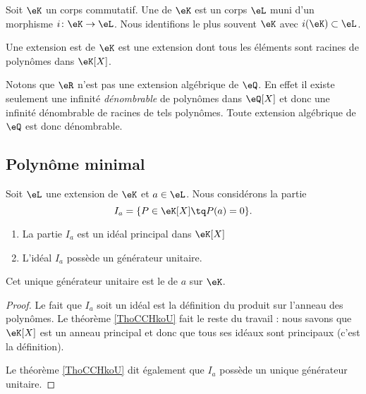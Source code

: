 \begin{definition}      \label{DEFooFLJJooGJYDOe}
    Soit \( \eK\) un corps commutatif. Une  de \( \eK\) est un corps \( \eL\) muni d'un morphisme \( i\colon \eK\to \eL\). Nous identifions le plus souvent \( \eK\) avec \( i(\eK)\subset \eL\).

    Une extension est  de \( \eK\) est une extension dont tous les éléments sont racines de polynômes dans \( \eK[X]\).
\end{definition}
Notons que \( \eR\) n'est pas une extension algébrique de \( \eQ\). En effet il existe seulement une infinité \emph{dénombrable} de polynômes dans \( \eQ[X]\) et donc une infinité dénombrable de racines de tels polynômes. Toute extension algébrique de \( \eQ\) est donc dénombrable.

\subsection{Polynôme minimal}

\begin{lemmaDef}    \label{DefCVMooFGSAgL}
    Soit \( \eL\) une extension de \( \eK\) et \( a\in \eL\). Nous considérons la partie
    \begin{equation}
        I_a=\{ P\in \eK[X]\tq P(a)=0 \}.
    \end{equation}

    \begin{enumerate}
        \item
            La partie \( I_a\) est un idéal principal dans \( \eK[X]\)
        \item
            L'idéal \( I_a\) possède un générateur unitaire.
    \end{enumerate}

    Cet unique générateur unitaire est le  de \( a\) sur \( \eK\).
\end{lemmaDef}

\begin{proof}
    Le fait que \( I_a\) soit un idéal est la définition du produit sur l'anneau des polynômes. Le théorème \ref{ThoCCHkoU} fait le reste du travail : nous savons que \( \eK[X]\) est un anneau principal et donc que tous ses idéaux sont principaux (c'est la définition).
   
    Le théorème \ref{ThoCCHkoU} dit également que \( I_a\) possède un unique générateur unitaire.
\end{proof}

